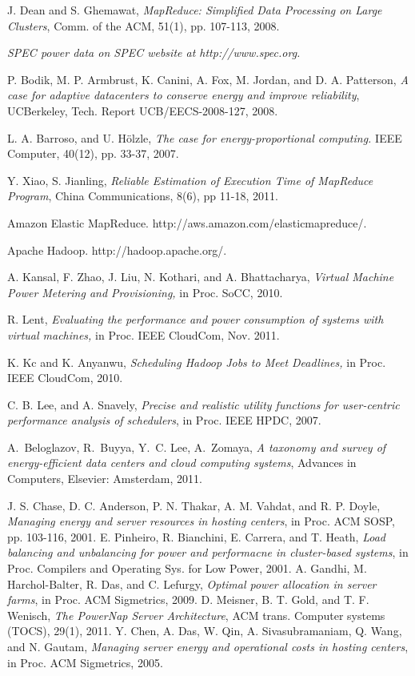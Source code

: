 \documentclass[10pt,conference,compsocconf,letterpaper]{IEEEtran}
\begin{document}
{{\begin{thebibliography}{1}
J. Dean and S. Ghemawat, \emph{MapReduce: Simplified Data Processing on Large Clusters}, Comm. of the ACM, 51(1), pp. 107-113, 2008.

\emph{SPEC power data on SPEC website at http://www.spec.org.}

P. Bodik, M. P. Armbrust, K. Canini, A. Fox, M. Jordan, and D. A. Patterson, \emph{A case for adaptive datacenters to conserve energy and improve reliability}, UCBerkeley, Tech. Report UCB/EECS-2008-127, 2008.

L. A. Barroso, and U. H\"{o}lzle, \emph{The case for energy-proportional computing.} IEEE Computer, 40(12), pp. 33-37, 2007.

Y. Xiao, S. Jianling, \emph{Reliable Estimation of Execution Time of MapReduce Program}, China Communications, 8(6), pp 11-18, 2011.


Amazon Elastic MapReduce.
http://aws.amazon.com/elasticmapreduce/.

Apache Hadoop. http://hadoop.apache.org/.


A. Kansal, F. Zhao, J. Liu, N. Kothari, and A. Bhattacharya, \emph{Virtual Machine Power Metering and Provisioning,} in Proc. SoCC, 2010.

R. Lent, \emph{Evaluating the performance and power consumption of systems with virtual machines,} in Proc. IEEE CloudCom, Nov. 2011.


K. Kc and K. Anyanwu, \emph{Scheduling Hadoop Jobs to Meet Deadlines,} in Proc. IEEE CloudCom, 2010.



C. B. Lee, and A. Snavely, \emph{Precise and realistic utility functions for user-centric performance analysis of schedulers}, in Proc. IEEE HPDC, 2007.









A.~Beloglazov, R.~Buyya, Y.~C. Lee, A.~Zomaya, \emph{A taxonomy and survey of energy-efficient data centers and cloud computing systems}, Advances in Computers, Elsevier: Amsterdam, 2011.

J. S. Chase, D. C. Anderson, P. N. Thakar, A. M. Vahdat, and R. P. Doyle, \emph{Managing energy and server resources in hosting centers}, in Proc. ACM SOSP, pp. 103-116, 2001.
E. Pinheiro, R. Bianchini, E. Carrera, and T. Heath, \emph{Load balancing and unbalancing for power and performacne in cluster-based systems}, in Proc. Compilers and Operating Sys. for Low Power, 2001.
A. Gandhi, M. Harchol-Balter, R. Das, and C. Lefurgy, \emph{Optimal power allocation in server farms}, in Proc. ACM Sigmetrics, 2009.
D. Meisner, B. T. Gold, and T. F. Wenisch, \emph{The PowerNap Server Architecture}, ACM trans. Computer systems (TOCS), 29(1), 2011.
Y. Chen, A. Das, W. Qin, A. Sivasubramaniam, Q. Wang, and N. Gautam, \emph{Managing server energy and operational costs in hosting centers}, in Proc. ACM Sigmetrics, 2005.


\end{thebibliography}}}
\end{document}
